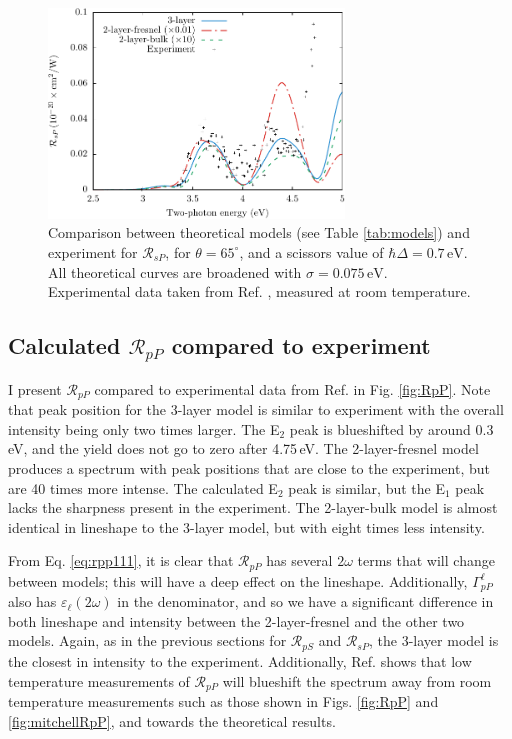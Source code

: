 \begin{figure}
\centering
\includegraphics[width=0.7\textwidth]{content/figures/fig-4_4_04}
\caption{Comparison between theoretical models (see Table \ref{tab:models}) and
experiment for $\mathcal{R}_{sP}$, for $\theta=65^{\circ}$, and a scissors
value of $\hbar\Delta = 0.7\,\text{eV}$. All theoretical curves are broadened
with $\sigma=0.075\,\text{eV}$. Experimental data taken from Ref.
\cite{mejiaPRB02}, measured at room temperature.}
\label{fig:RsP}
\end{figure}



\subsection{Calculated \texorpdfstring{$\mathcal{R}_{pP}$}{RpP} compared to
experiment}\label{sec:1x1RpP}

I present $\mathcal{R}_{pP}$ compared to experimental data from Ref.
\cite{mejiaPRB02} in Fig. \ref{fig:RpP}. Note that peak position for the 3-layer
model is similar to experiment with the overall intensity being only two times
larger. The E$_{2}$ peak is blueshifted by around 0.3\,eV, and the yield does
not go to zero after 4.75\,eV. The 2-layer-fresnel model produces a spectrum
with peak positions that are close to the experiment, but are 40 times more
intense. The calculated E$_{2}$ peak is similar, but the E$_{1}$ peak lacks the
sharpness present in the experiment. The 2-layer-bulk model is almost identical
in lineshape to the 3-layer model, but with eight times less intensity.

From Eq. \eqref{eq:rpp111}, it is clear that $\mathcal{R}_{pP}$ has several
$2\omega$ terms that will change between models; this will have a deep effect on
the lineshape. Additionally, $\Gamma^{\ell}_{pP}$ also has
$\varepsilon_{\ell}(2\omega)$ in the denominator, and so we have a significant
difference in both lineshape and intensity between the 2-layer-fresnel and the
other two models. Again, as in the previous sections for $\mathcal{R}_{pS}$ and
$\mathcal{R}_{sP}$, the 3-layer model is the closest in intensity to the
experiment. Additionally, Ref. \cite{dadapPRB97} shows that low temperature
measurements of $\mathcal{R}_{pP}$ will blueshift the spectrum away from room
temperature measurements such as those shown in Figs. \ref{fig:RpP} and
\ref{fig:mitchellRpP}, and towards the theoretical results.

